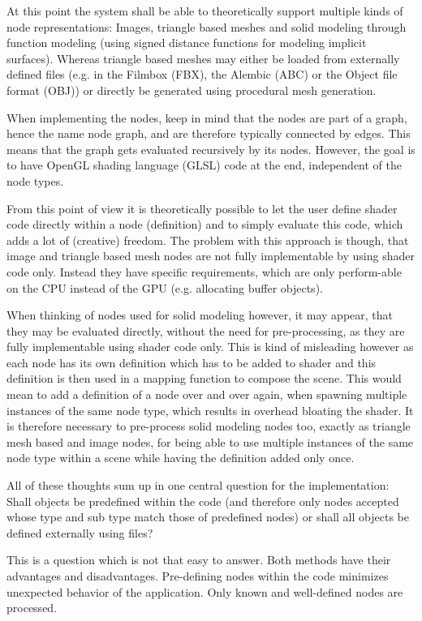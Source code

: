 \documentclass[10pt, openright, notitlepage]{scrreprt}
\begin{document}
At this point the system shall be able to theoretically support multiple kinds of
node representations: Images, triangle based meshes and solid modeling through
function modeling (using signed distance functions for modeling implicit
surfaces). Whereas triangle based meshes may either be loaded from externally
defined files (e.g. in the Filmbox (FBX), the Alembic (ABC) or the Object file
format (OBJ)) or directly be generated using procedural mesh generation.

When implementing the nodes, keep in mind that the nodes are part of a graph,
hence the name node graph, and are therefore typically connected by edges. This
means that the graph gets evaluated recursively by its nodes. However, the goal
is to have OpenGL shading language (GLSL) code at the end, independent of the
node types.

From this point of view it is theoretically possible to let the user define shader
code directly within a node (definition) and to simply evaluate this code, which
adds a lot of (creative) freedom. The problem with this approach is though, that
image and triangle based mesh nodes are not fully implementable by using shader
code only. Instead they have specific requirements, which are only perform-able
on the CPU instead of the GPU (e.g. allocating buffer objects).

When thinking of nodes used for solid modeling however, it may appear, that they
may be evaluated directly, without the need for pre-processing, as they are
fully implementable using shader code only. This is kind of misleading however
as each node has its own definition which has to be added to shader and this
definition is then used in a mapping function to compose the scene. This would
mean to add a definition of a node over and over again, when spawning multiple
instances of the same node type, which results in overhead bloating the shader.
It is therefore necessary to pre-process solid modeling nodes too, exactly as
triangle mesh based and image nodes, for being able to use multiple instances of
the same node type within a scene while having the definition added only once.

All of these thoughts sum up in one central question for the implementation:
Shall objects be predefined within the code (and therefore only nodes accepted
whose type and sub type match those of predefined nodes) or shall all objects be
defined externally using files?

This is a question which is not that easy to answer. Both methods have their
advantages and disadvantages. Pre-defining nodes within the code minimizes
unexpected behavior of the application. Only known and well-defined nodes are
processed.
\end{document}
